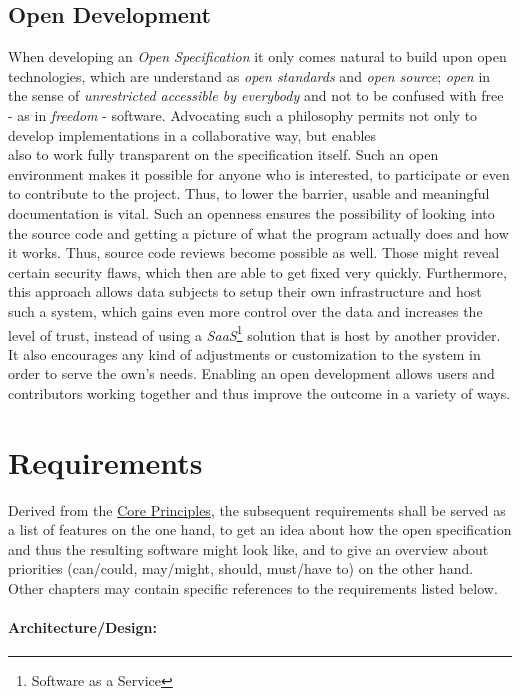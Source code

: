 \documentclass[12pt,english,a4paper,titlepage,cleardoublepage=empty,dottedtoc]{report}
\begin{document}
\section{Open Development}\label{open-development}

When developing an \emph{Open Specification} it only comes natural to
build upon open technologies, which are understand as \emph{open
standards} and \emph{open source}; \emph{open} in the sense of
\emph{unrestricted accessible by everybody} and not to be confused with
free - as in \emph{freedom} - software. Advocating such a philosophy
permits not only to develop implementations in a collaborative way, but
enables\\
also to work fully transparent on the specification itself. Such an open
environment makes it possible for anyone who is interested, to
participate or even to contribute to the project. Thus, to lower the
barrier, usable and meaningful documentation is vital. Such an openness
ensures the possibility of looking into the source code and getting a
picture of what the program actually does and how it works. Thus, source
code reviews become possible as well. Those might reveal certain
security flaws, which then are able to get fixed very quickly.
Furthermore, this approach allows data subjects to setup their own
infrastructure and host such a system, which gains even more control
over the data and increases the level of trust, instead of using a
\emph{SaaS}\footnote{Software as a Service} solution that is host by
another provider. It also encourages any kind of adjustments or
customization to the system in order to serve the own's needs. Enabling
an open development allows users and contributors working together and
thus improve the outcome in a variety of ways.

\chapter{Requirements}\label{requirements}

Derived from the \protect\hyperlink{core-principles}{Core Principles},
the subsequent requirements shall be served as a list of features on the
one hand, to get an idea about how the open specification and thus the
resulting software might look like, and to give an overview about
priorities (can/could, may/might, should, must/have to) on the other
hand. Other chapters may contain specific references to the requirements
listed below.

\subsubsection{Architecture/Design:}\label{architecturedesign}
\end{document}
